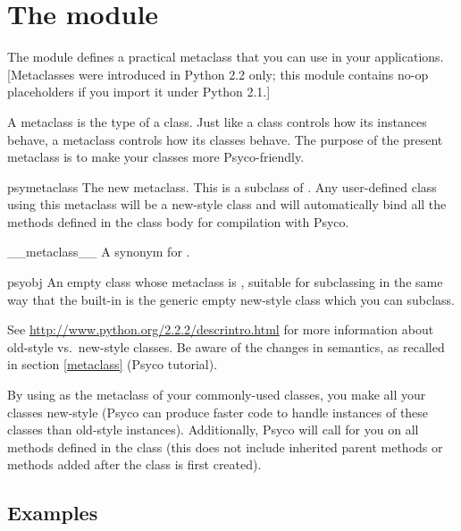 \documentclass{manual}
\begin{document}
\section{The  module}

The  module defines a practical metaclass that you can use in your applications.  [Metaclasses were introduced in Python 2.2 only; this module contains no-op placeholders if you import it under Python 2.1.]

A metaclass is the type of a class.  Just like a class controls how its instances behave, a metaclass controls how its classes behave.  The purpose of the present metaclass is to make your classes more Psyco-friendly.

\begin{classdesc*}{psymetaclass}
The new metaclass.  This is a subclass of . Any user-defined class using this metaclass will be a new-style class and will automatically bind all the methods defined in the class body for compilation with Psyco.
\end{classdesc*}

\begin{classdesc*}{__metaclass__}
A synonym for .
\end{classdesc*}

\begin{classdesc*}{psyobj}
An empty class whose metaclass is , suitable for subclassing in the same way that the built-in  is the generic empty new-style class which you can subclass.
\end{classdesc*}

See \url{http://www.python.org/2.2.2/descrintro.html} for more information about old-style vs.\ new-style classes.  Be aware of the changes in semantics, as recalled in section \ref{metaclass} (Psyco tutorial).

By using  as the metaclass of your commonly-used classes, you make all your classes new-style (Psyco can produce faster code to handle instances of these classes than old-style instances).  Additionally, Psyco will call  for you on all methods defined in the class (this does not include inherited parent methods or methods added after the class is first created).

\subsection{Examples}
\end{document}
